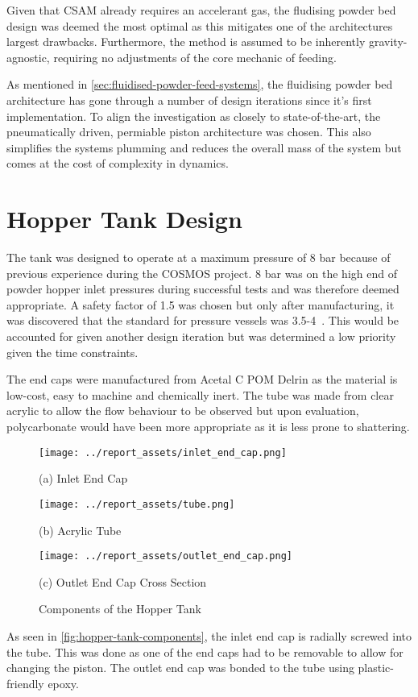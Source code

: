 Given that CSAM already requires an accelerant gas, the fludising powder bed design was deemed the most optimal as this mitigates one of the architectures largest drawbacks. Furthermore, the method is assumed to be inherently gravity-agnostic, requiring no adjustments of the core mechanic of feeding. 

As mentioned in \autoref{sec:fluidised-powder-feed-systems}, the fluidising powder bed architecture has gone through a number of design iterations since it's first implementation. To align the investigation as closely to state-of-the-art, the pneumatically driven, permiable piston architecture was chosen. This also simplifies the systems plumming and reduces the overall mass of the system but comes at the cost of complexity in dynamics.

\section{Hopper Tank Design}
The tank was designed to operate at a maximum pressure of 8 bar because of previous experience during the COSMOS project. 8 bar was on the high end of powder hopper inlet pressures during successful tests and was therefore deemed appropriate. A safety factor of 1.5 was chosen but only after manufacturing, it was discovered that the standard for pressure vessels was 3.5-4~\cite{redriver2024asme}. This would be accounted for given another design iteration but was determined a low priority given the time constraints.

The end caps were manufactured from Acetal C POM Delrin as the material is low-cost, easy to machine and chemically inert. The tube was made from clear acrylic to allow the flow behaviour to be observed but upon evaluation, polycarbonate would have been more appropriate as it is less prone to shattering.
\begin{figure}[htbp]
    \centering

    \begin{minipage}{0.3\textwidth}
        \centering
        \texttt{[image: ../report\_assets/inlet\_end\_cap.png]}
        \caption*{(a) Inlet End Cap}
    \end{minipage}
    \hfill
    \begin{minipage}{0.3\textwidth}
        \centering
        \texttt{[image: ../report\_assets/tube.png]}
        \caption*{(b) Acrylic Tube}
    \end{minipage}
    \hfill
    \begin{minipage}{0.3\textwidth}
        \centering
        \texttt{[image: ../report\_assets/outlet\_end\_cap.png]}
        \caption*{(c) Outlet End Cap Cross Section}
    \end{minipage}
    \caption{Components of the Hopper Tank}\label{fig:hopper-tank-components}
\end{figure}
As seen in \autoref{fig:hopper-tank-components}, the inlet end cap is radially screwed into the tube. This was done as one of the end caps had to be removable to allow for changing the piston. The outlet end cap was bonded to the tube using plastic-friendly epoxy.

